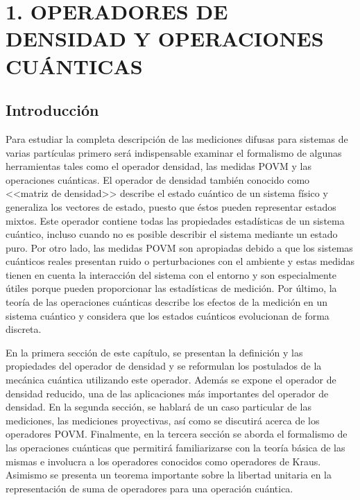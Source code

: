 \chapter[OPERADORES DE DENSIDAD Y OPERACIONES CUÁNTICAS]{1. OPERADORES DE DENSIDAD Y OPERACIONES CUÁNTICAS}
\section{Introducción}\label{cap:IntroduccionMarcoteorico} %

Para estudiar la completa descripción  de las mediciones difusas para sistemas
de varias partículas primero será indispensable examinar el formalismo de
algunas herramientas tales como el operador densidad, las medidas POVM y las
operaciones cuánticas. El operador de densidad también conocido como <<matriz
de densidad>> describe el estado cuántico de un sistema físico y generaliza los
vectores de estado, puesto que éstos pueden representar estados mixtos. Este
operador contiene todas las propiedades estadísticas de un sistema cuántico,
incluso cuando no es posible describir el sistema mediante un estado puro. Por
otro lado, las medidas POVM son apropiadas debido a que los sistemas cuánticos
reales presentan ruido o perturbaciones con el ambiente 
y estas medidas tienen
en cuenta la interacción del sistema con el entorno y son especialmente útiles
porque pueden proporcionar las estadísticas de medición. Por último, la teoría
de las operaciones cuánticas describe los efectos de la medición en un sistema
cuántico y considera que los estados cuánticos evolucionan de forma discreta.  

En la primera sección de este capítulo, se presentan la definición y las propiedades del
operador de densidad y se reformulan los postulados de la mecánica cuántica
utilizando este operador. Además se expone el operador de densidad reducido,
una de las aplicaciones más importantes del operador de densidad. En la segunda
sección, se hablará de un caso particular de las mediciones, las mediciones
proyectivas, así como se discutirá acerca de los operadores POVM\@. Finalmente,
en la tercera sección se aborda el formalismo de las operaciones cuánticas que
permitirá familiarizarse con la teoría básica de las mismas e involucra a los
operadores conocidos como operadores de Kraus. Asimismo se presenta un teorema
importante sobre la libertad unitaria en la representación de suma de
operadores para una operación cuántica.
